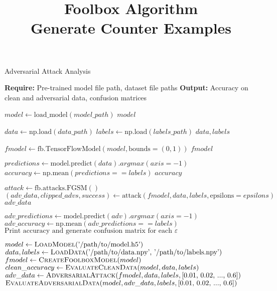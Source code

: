 \documentclass[11pt,onside]{article}
\title{\blue Foolbox Algorithm \\
\blueb Generate Counter Examples}
\author{}
\begin{document}
\maketitle

\begin{algorithm}
\caption{Adversarial Attack Analysis}
\begin{algorithmic}[1]

\State \textbf{Require:} Pre-trained model file path, dataset file paths
\State \textbf{Output:} Accuracy on clean and adversarial data, confusion matrices

    \State $model \gets \text{load\_model}(model\_path)$
    \State \Return $model$
\EndProcedure

    \State $data \gets \text{np.load}(data\_path)$
    \State $labels \gets \text{np.load}(labels\_path)$
    \State \Return $data, labels$
\EndProcedure

    \State $fmodel \gets \text{fb.TensorFlowModel}(model, \text{bounds}=(0, 1))$
    \State \Return $fmodel$
\EndProcedure

    \State $predictions \gets \text{model.predict}(data).argmax(axis=-1)$
    \State $accuracy \gets \text{np.mean}(predictions == labels)$
    \State \Return $accuracy$
\EndProcedure

    \State $attack \gets \text{fb.attacks.FGSM}()$
    \State $(adv\_data, clipped\_advs, success) \gets \text{attack}(fmodel, data, labels, \text{epsilons}=epsilons)$
    \State \Return $adv\_data$
\EndProcedure

        \State $adv\_predictions \gets \text{model.predict}(adv).argmax(axis=-1)$
        \State $adv\_accuracy \gets \text{np.mean}(adv\_predictions == labels)$
        \State $\text{Print accuracy and generate confusion matrix for each } \varepsilon$
    \EndFor
\EndProcedure

\State $model \gets \Call{LoadModel}{\text{'/path/to/model.h5'}}$
\State $data, labels \gets \Call{LoadData}{\text{'/path/to/data.npy', '/path/to/labels.npy'}}$
\State $fmodel \gets \Call{CreateFoolboxModel}{model}$
\State $clean\_accuracy \gets \Call{EvaluateCleanData}{model, data, labels}$
\State $adv\_data \gets \Call{AdversarialAttack}{fmodel, data, labels, \text{[0.01, 0.02, ..., 0.6]}}$
\State $\Call{EvaluateAdversarialData}{model, adv\_data, labels, \text{[0.01, 0.02, ..., 0.6]}}$

\end{algorithmic}
\end{algorithm}
\end{document}
